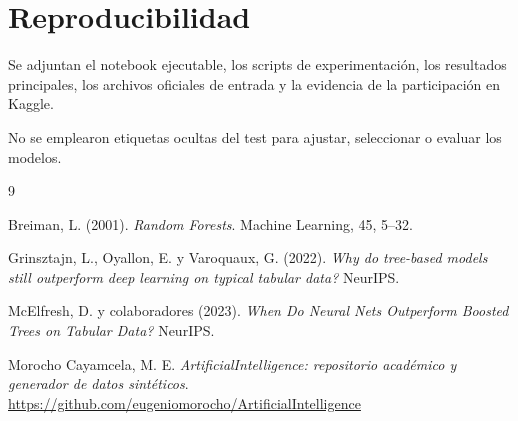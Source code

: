 ﻿\documentclass[11pt,a4paper]{article}
\begin{document}
\section*{Reproducibilidad}

Se adjuntan el notebook ejecutable, los scripts
de experimentación, los resultados principales,
los archivos oficiales de entrada y la evidencia
de la participación en Kaggle.

No se emplearon etiquetas ocultas del test
para ajustar, seleccionar o evaluar los modelos.

\begin{thebibliography}{9}

Breiman, L. (2001).
\emph{Random Forests}.
Machine Learning, 45, 5--32.

Grinsztajn, L., Oyallon, E. y Varoquaux, G.
(2022).
\emph{Why do tree-based models still outperform
deep learning on typical tabular data?}
NeurIPS.

McElfresh, D. y colaboradores (2023).
\emph{When Do Neural Nets Outperform
Boosted Trees on Tabular Data?}
NeurIPS.

Morocho Cayamcela, M. E.
\emph{ArtificialIntelligence: repositorio
académico y generador de datos sintéticos}.
\url{https://github.com/eugeniomorocho/ArtificialIntelligence}

\end{thebibliography}
\end{document}
